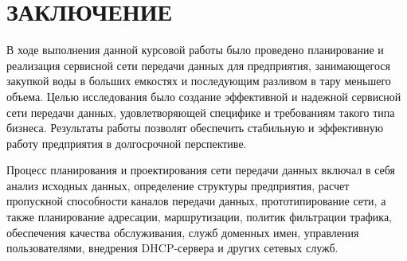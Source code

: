 %
%
%
% 
%
% 
%
\section*{ЗАКЛЮЧЕНИЕ} 
В ходе выполнения данной курсовой работы было проведено планирование и реализация сервисной сети передачи данных для предприятия, занимающегося закупкой воды в больших емкостях и последующим разливом в тару меньшего объема. Целью исследования было создание эффективной и надежной сервисной сети передачи данных, удовлетворяющей специфике и требованиям такого типа бизнеса.
Результаты работы позволят обеспечить стабильную и эффективную работу предприятия в долгосрочной перспективе.

Процесс планирования и проектирования сети передачи данных включал в себя анализ исходных данных, определение структуры предприятия, расчет пропускной способности каналов передачи данных, прототипирование сети, а также планирование адресации, маршрутизации, политик фильтрации трафика, обеспечения качества обслуживания, служб доменных имен, управления пользователями, внедрения DHCP-сервера и других сетевых служб.

